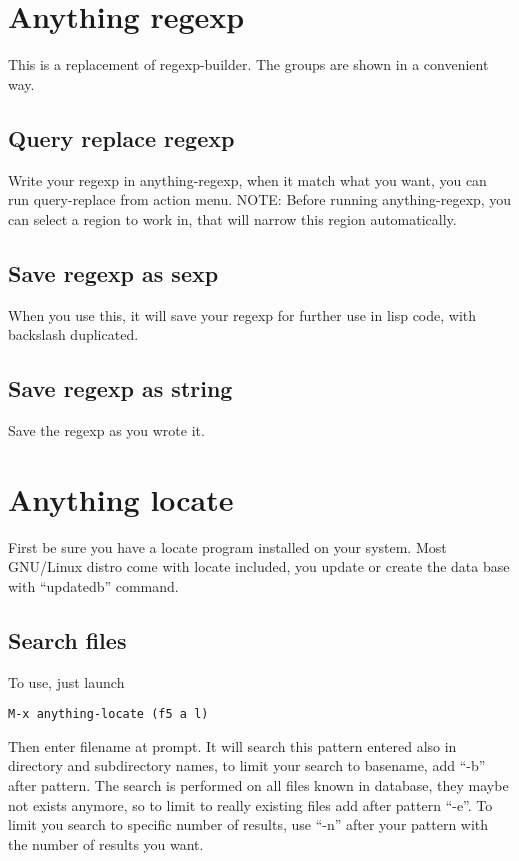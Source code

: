 \documentclass[a4paper,11pt]{article}
\begin{document}
\section{Anything regexp}
\label{sec:anything-regexp}
This is a replacement of regexp-builder.
The groups are shown in a convenient way.

\subsection{Query replace regexp}
\label{sec:query-replace-regexp}
Write your regexp in anything-regexp, when it match what you want,
you can run query-replace from action menu.
NOTE:
Before running anything-regexp, you can select a region to work in, that will narrow this region
automatically. 
\subsection{Save regexp as sexp}
\label{sec:save-regexp-as}
When you use this, it will save your regexp for further use in lisp code,
with backslash duplicated.

\subsection{Save regexp as string}
\label{sec:save-regexp-as-1}
Save the regexp as you wrote it.

\section{Anything locate}
\label{sec:anything-locate}
First be sure you have a locate program installed on your system.
Most GNU/Linux distro come with locate included, you update or create the data base with
``updatedb'' command.

\subsection{Search files}
\label{sec:search-files}

To use, just launch 
\begin{verbatim}
M-x anything-locate (f5 a l)
\end{verbatim}

Then enter filename at prompt.
It will search this pattern entered also in directory and subdirectory names, to limit your search to basename,
add ``-b'' after pattern.
The search is performed on all files known in database, they maybe not exists anymore, so to limit to
really existing files add after pattern ``-e''.
To limit you search to specific number of results, use ``-n'' after your pattern with the number of results
you want.
\end{document}
